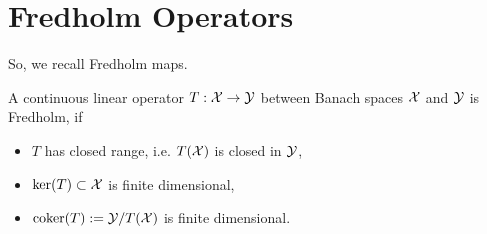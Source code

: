 \documentclass{article}
\begin{document}


\section{Fredholm Operators} 
So, we recall Fredholm maps. 
\begin{definition}
    A continuous linear operator $T : \mathcal{X} \to\mathcal{Y}$ between Banach spaces $\mathcal{X}$ and $\mathcal{Y}$ is Fredholm, if 
    \begin{itemize}
        \item $T$ has closed range, i.e. $T(\mathcal{X})$ is closed in $\mathcal{Y}$, 
        \item ${\mathrm{ker}}(T) \subset \mathcal{X} $ is finite dimensional, 
        \item ${\mathrm{coker}}(T) := \mathcal{Y} / T(\mathcal{X})$ is finite dimensional. 
    \end{itemize}
\end{definition}
\end{document}

